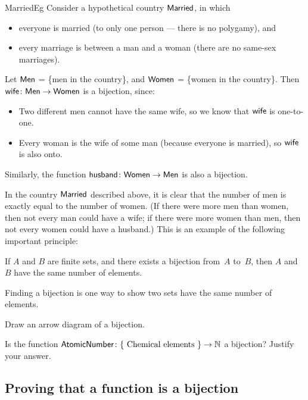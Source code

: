  \begin{example}{MarriedEg}
 Consider a hypothetical country $\sf{Married}$, in which 
 \begin{itemize}
 \item everyone is married (to only one person --- there is no polygamy),
 and
 \item every marriage is between a man and a woman (there are no same-sex marriages). 
 \end{itemize}
Let $\sf{Men}$ = \{men in the country\}, and 
$\sf{Women}$ = \{women in the country\}.
Then $\sf{wife} \colon \sf{Men} \to \sf{Women}$ is a bijection, since:
\begin{itemize}
 \item Two different men cannot have the same wife, so we know that $\sf{wife}$ is one-to-one. 
 \item Every woman is the wife of some man (because everyone is married), so $\sf{wife}$ is also onto.
 \end{itemize}
Similarly, the function $\sf{husband} \colon \sf{Women} \to \sf{Men}$ is also a bijection.
 \end{example}

\begin{rem}
In the country $\sf{Married}$ described above, it is clear that the number of men is exactly equal to the number of women. (If there were more men than women, then not every man could have a wife; if there were more women than men, then not every women could have a husband.) This is an example of the following important principle:
	
\begin{center}
If $A$ and $B$ are finite sets, and there exists a bijection from~$A$ to~$B$, 
	then $A$ and~$B$ have
	 the same number of elements.
\end{center}

Finding a bijection is one way to show two sets have the same number of elements.
\end{rem}

\begin{exercise}{}
Draw an arrow diagram of a bijection.
\end{exercise}

\begin{exercise}{}
Is the function $\sf{Atomic Number} \colon \{ \mbox{ Chemical elements } \} \to \mathbb{N}$ a bijection?  Justify your answer.
\end{exercise}


\subsection{Proving that a function is a bijection}

